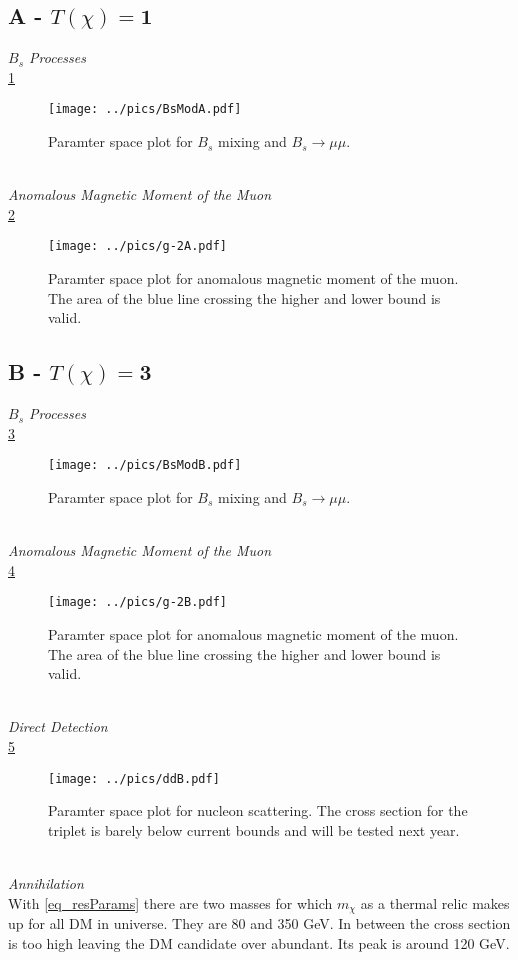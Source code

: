 \subsection{A - $T(\chi)=\boldsymbol{1}$}
\textit{$B_s$ Processes}\\
\noindent \ref{pic_BsResA}
\begin{figure}[t]
 \texttt{[image: ../pics/BsModA.pdf]}
 \caption{Paramter space plot for $B_s$ mixing and $B_s\rightarrow \mu\mu$.}
 \label{pic_BsResA}
\end{figure}
\\ \textit{Anomalous Magnetic Moment of the Muon}\\
\noindent \ref{pic_g-2A}
\begin{figure}[t]
 \texttt{[image: ../pics/g-2A.pdf]}
 \caption{Paramter space plot for anomalous magnetic moment of the muon. The area of the blue line crossing the higher and lower bound is valid.}
 \label{pic_g-2A}
\end{figure}

\subsection{B - $T(\chi)=\boldsymbol{3}$}
\textit{$B_s$ Processes}\\
\noindent \ref{pic_BsResB}
\begin{figure}[t]
 \texttt{[image: ../pics/BsModB.pdf]}
 \caption{Paramter space plot for $B_s$ mixing and $B_s\rightarrow \mu\mu$.}
 \label{pic_BsResB}
\end{figure}
\\ \textit{Anomalous Magnetic Moment of the Muon}\\
\noindent \ref{pic_g-2B}
\begin{figure}[t]
 \texttt{[image: ../pics/g-2B.pdf]}
 \caption{Paramter space plot for anomalous magnetic moment of the muon. The area of the blue line crossing the higher and lower bound is valid.}
 \label{pic_g-2B}
\end{figure}
\\ \textit{Direct Detection} \\
\noindent \ref{pic_ddB}
\begin{figure}[t]
 \texttt{[image: ../pics/ddB.pdf]}
 \caption{Paramter space plot for nucleon scattering. The cross section for the triplet is barely below current bounds and will be tested next year.}
 \label{pic_ddB}
\end{figure}
\\ \textit{Annihilation}\\
With \eqref{eq_resParams} there are two masses for which $m_\chi$ as a thermal relic makes up for all DM in universe. They are 80 and 350 GeV. In
between the cross section is too high leaving the DM candidate over abundant. Its peak is around 120 GeV.